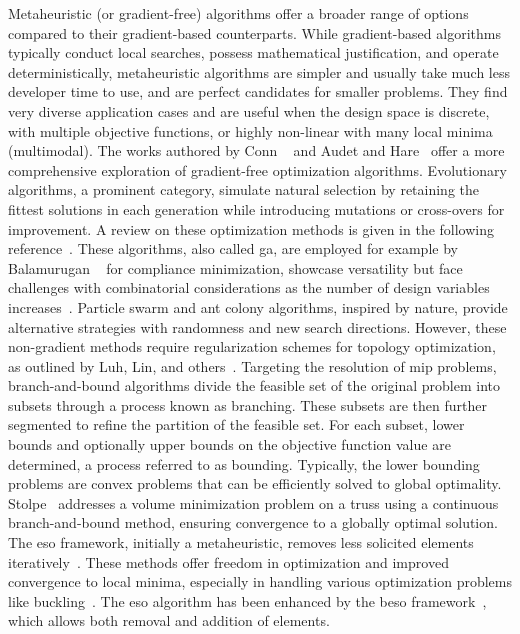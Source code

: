 Metaheuristic (or gradient-free) algorithms offer a broader range of options compared to their gradient-based counterparts. While gradient-based algorithms typically conduct local searches, possess mathematical justification, and operate deterministically, metaheuristic algorithms are simpler and usually take much less developer time to use, and are perfect candidates for smaller problems. They find very diverse application cases and are useful when the design space is discrete, with multiple objective functions, or highly non-linear with many local minima (multimodal). The works authored by Conn \etal~ and Audet and Hare~ offer a more comprehensive exploration of gradient-free optimization algorithms. Evolutionary algorithms, a prominent category, simulate natural selection by retaining the fittest solutions in each generation while introducing mutations or cross-overs for improvement. A review on these optimization methods is given in the following reference~. These algorithms, also called \gls{ga}, are employed for example by Balamurugan \etal~ for compliance minimization, showcase versatility but face challenges with combinatorial considerations as the number of design variables increases~. Particle swarm and ant colony algorithms, inspired by nature, provide alternative strategies with randomness and new search directions. However, these non-gradient methods require regularization schemes for topology optimization, as outlined by Luh, Lin, and others~.
Targeting the resolution of \gls{mip} problems, branch-and-bound algorithms divide the feasible set of the original problem into subsets through a process known as branching. These subsets are then further segmented to refine the partition of the feasible set. For each subset, lower bounds and optionally upper bounds on the objective function value are determined, a process referred to as bounding. Typically, the lower bounding problems are convex problems that can be efficiently solved to global optimality. Stolpe~ addresses a volume minimization problem on a truss using a continuous branch-and-bound method, ensuring convergence to a globally optimal solution. The \gls{eso} framework, initially a metaheuristic, removes less solicited elements iteratively~. These methods offer freedom in optimization and improved convergence to local minima, especially in handling various optimization problems like buckling~. The \gls{eso} algorithm has been enhanced by the \gls{beso} framework~, which allows both removal and addition of elements. 

